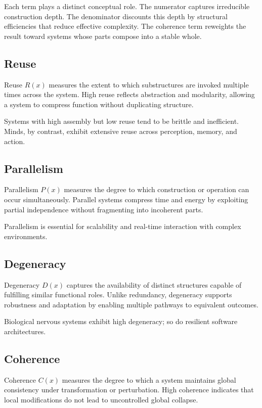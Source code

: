 \documentclass[11pt,letterpaper]{article}
\begin{document}
Each term plays a distinct conceptual role. The numerator captures irreducible construction depth. The denominator discounts this depth by structural efficiencies that reduce effective complexity. The coherence term reweights the result toward systems whose parts compose into a stable whole.

\subsection{Reuse}

Reuse $R(x)$ measures the extent to which substructures are invoked multiple times across the system. High reuse reflects abstraction and modularity, allowing a system to compress function without duplicating structure.

Systems with high assembly but low reuse tend to be brittle and inefficient. Minds, by contrast, exhibit extensive reuse across perception, memory, and action.

\subsection{Parallelism}

Parallelism $P(x)$ measures the degree to which construction or operation can occur simultaneously. Parallel systems compress time and energy by exploiting partial independence without fragmenting into incoherent parts.

Parallelism is essential for scalability and real-time interaction with complex environments.

\subsection{Degeneracy}

Degeneracy $D(x)$ captures the availability of distinct structures capable of fulfilling similar functional roles. Unlike redundancy, degeneracy supports robustness and adaptation by enabling multiple pathways to equivalent outcomes.

Biological nervous systems exhibit high degeneracy; so do resilient software architectures.

\subsection{Coherence}

Coherence $C(x)$ measures the degree to which a system maintains global consistency under transformation or perturbation. High coherence indicates that local modifications do not lead to uncontrolled global collapse.
\end{document}
